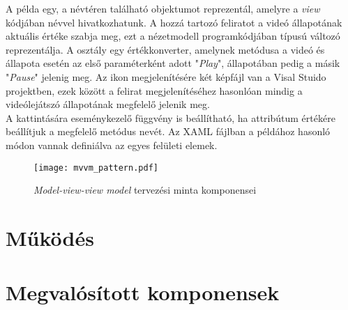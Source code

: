 A példa egy, a  névtéren található  objektumot reprezentál, amelyre a \emph{view} kódjában  névvel hivatkozhatunk. A hozzá tartozó feliratot a videó állapotának aktuális értéke szabja meg, ezt a nézetmodell programkódjában  típusú változó reprezentálja. A  osztály egy értékkonverter, amelynek  metódusa a videó  és  állapota esetén az első  paraméterként adott "\emph{Play}",  állapotában pedig a másik "\emph{Pause}"  jelenig meg. Az ikon megjelenítésére két képfájl van a Visal Stuido projektben, ezek között a felirat megjelenítéséhez hasonlóan mindig a videólejátszó állapotának megfelelő jelenik meg. \\
A  kattintására eseménykezelő függvény is beállítható, ha  attribútum értékére beállítjuk a megfelelő metódus nevét. Az XAML fájlban a példához hasonló módon vannak definiálva az egyes felületi elemek.

\begin{figure}[h]
\vspace{.5cm}
\texttt{[image: mvvm\_pattern.pdf]}
\centering
\vspace{.2cm}
\caption{\emph{Model-view-view model} tervezési minta komponensei}
\vspace{.5cm}
\label{fig:mvvm_pattern}
\end{figure}

\section{Működés}

\section{Megvalósított komponensek}
